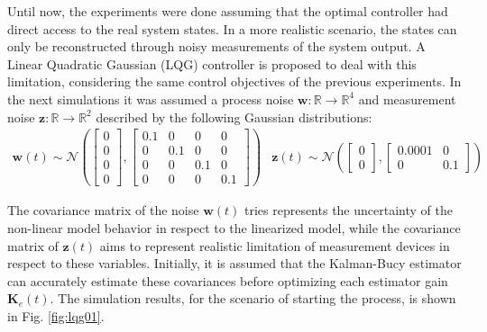 \documentclass[a4paper,11pt]{book}
\numberwithin{figure}{chapter}
\numberwithin{equation}{chapter}
\numberwithin{table}{chapter}
\theoremstyle{definition}
\begin{document}
Until now, the experiments were done assuming that the optimal controller had direct access to the real system states. In a more realistic scenario, the states can only be reconstructed through noisy measurements of the system output. A Linear Quadratic Gaussian (LQG) controller is proposed to deal with this limitation, considering the same control objectives of the previous experiments. In the next simulations it was assumed a process noise $\bm{w} : \mathbb{R} \rightarrow \mathbb{R}^{4}$ and measurement noise $\bm{z} : \mathbb{R} \rightarrow \mathbb{R}^{2}$ described by the following Gaussian distributions:
\begin{equation}
\begin{matrix}
	\bm{w}(t) \sim \mathcal{N}\left( \begin{bmatrix} 0 \\ 0 \\ 0 \\ 0 \end{bmatrix}, \begin{bmatrix} 0.1 & 0 & 0 & 0 \\ 0 & 0.1 & 0 & 0 \\ 0 & 0 & 0.1 & 0 \\ 0 & 0 & 0 & 0.1 \end{bmatrix} \right) & 
\bm{z}(t) \sim \mathcal{N}\left( \begin{bmatrix} 0 \\ 0 \end{bmatrix}, \begin{bmatrix} 0.0001 & 0 \\ 0 & 0.1 \end{bmatrix} \right)
\end{matrix}
\end{equation}

The covariance matrix of the noise $\bm{w}(t)$ tries represents the uncertainty of the non-linear model behavior in respect to the linearized model, while the covariance matrix of $\bm{z}(t)$ aims to represent realistic limitation of measurement devices in respect to these variables. Initially, it is assumed that the Kalman-Bucy estimator can accurately estimate these covariances before optimizing each estimator gain $\bm{K}_e(t)$. The simulation results, for the scenario of starting the process, is shown in Fig. \ref{fig:lqg01}.
 
\end{document}
